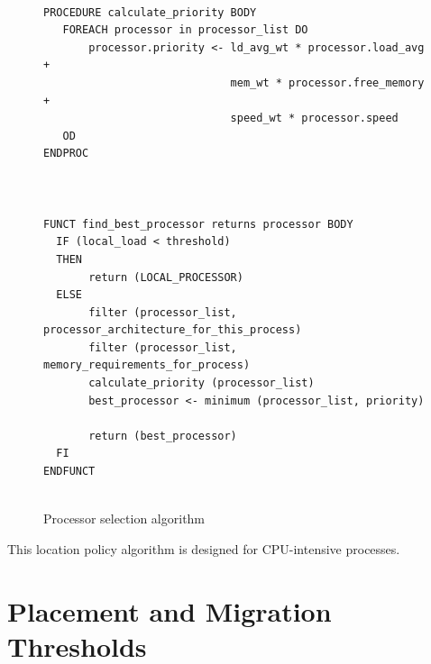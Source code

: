 \documentclass{report}
\begin{document}
\begin{figure}
\label{fig:selection_alg}

\begin{verbatim}

PROCEDURE calculate_priority BODY
   FOREACH processor in processor_list DO
       processor.priority <- ld_avg_wt * processor.load_avg +
                             mem_wt * processor.free_memory +
                             speed_wt * processor.speed
   OD
ENDPROC



FUNCT find_best_processor returns processor BODY
  IF (local_load < threshold)
  THEN
       return (LOCAL_PROCESSOR)
  ELSE
       filter (processor_list, processor_architecture_for_this_process)
       filter (processor_list, memory_requirements_for_process)
       calculate_priority (processor_list)
       best_processor <- minimum (processor_list, priority)

       return (best_processor)
  FI
ENDFUNCT


\end{verbatim}
\caption{Processor selection algorithm}








\end{figure}


This location policy algorithm is designed for CPU-intensive processes.



\section{Placement and Migration Thresholds}
\label{threshold}
\end{document}

